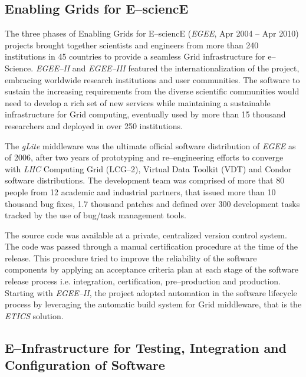 \documentclass[journal]{IEEEtran}
\begin{document}
\subsection{Enabling Grids for E--sciencE}

The three phases of Enabling Grids for E--sciencE ({\sl EGEE}, Apr 2004 -- Apr 2010)
\cite{cordis:egee, cordis:egee2, cordis:egee3} projects brought together
scientists and engineers from more than 240 institutions in 45 countries to
provide a seamless Grid infrastructure for e--Science. {\sl EGEE--II} and {\sl EGEE--III}
featured the internationalization of the project, embracing worldwide research
institutions and user communities. The software to sustain the increasing
requirements from the diverse scientific communities would need to develop a
rich set of new services while maintaining a sustainable infrastructure for
Grid computing, eventually used by more than 15 thousand researchers and deployed in
over 250 institutions.

The {\sl gLite} middleware \cite{glite} was the ultimate
official software distribution of {\sl EGEE} as of 2006, after two years of prototyping and
re--engineering efforts to converge with {\sl LHC} Computing Grid (LCG--2), Virtual
Data Toolkit (VDT) and Condor \cite{condor} software distributions. The
development team was comprised of more that 80 people from 12 academic and
industrial partners, that issued more than 10 thousand bug fixes, 1.7 thousand patches and
defined over 300 development tasks tracked by the use of bug/task management tools.

The source code was available at a private, centralized version control system.
The code was passed through a manual certification procedure at the time of the release. 
This procedure tried to improve the reliability of the software components by applying an
acceptance criteria plan at each stage of the software release process 
\cite{egee:acceptance-criteria} i.e. integration, certification, pre--production and 
production. Starting with {\sl EGEE--II}, the project adopted automation in the software
lifecycle process by leveraging the automatic build system for Grid middleware, that is
the {\sl ETICS} \cite{etics} solution.

\subsection{E--Infrastructure for Testing, Integration and Configuration of Software}
\end{document}
